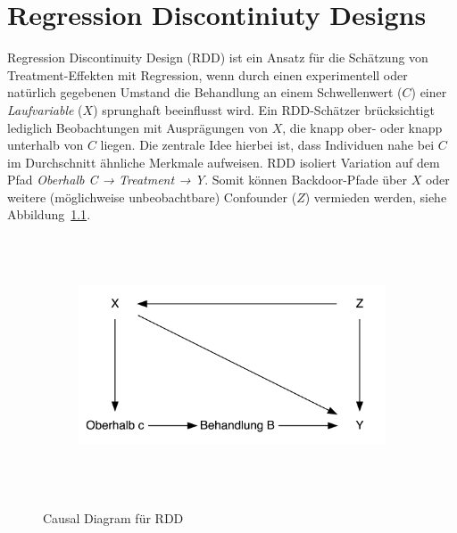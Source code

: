 \documentclass[
  letterpaper,
  DIV=11,
  oneside]{scrreprt}
\begin{document}

\hypertarget{regression-discontiniuty-designs}{%
\chapter{Regression Discontiniuty
Designs}\label{regression-discontiniuty-designs}}

Regression Discontinuity Design (RDD) ist ein Ansatz für die Schätzung
von Treatment-Effekten mit Regression, wenn durch einen experimentell
oder natürlich gegebenen Umstand die Behandlung an einem Schwellenwert
(\(C\)) einer \emph{Laufvariable} (\(X\)) sprunghaft beeinflusst wird.
Ein RDD-Schätzer brücksichtigt lediglich Beobachtungen mit Ausprägungen
von \(X\), die knapp ober- oder knapp unterhalb von \(C\) liegen. Die
zentrale Idee hierbei ist, dass Individuen nahe bei \(C\) im
Durchschnitt ähnliche Merkmale aufweisen. RDD isoliert Variation auf dem
Pfad \emph{Oberhalb C → Treatment → Y}. Somit können Backdoor-Pfade über
\(X\) oder weitere (möglichweise unbeobachtbare) Confounder (\(Z\))
vermieden werden, siehe Abbildung~\ref{fig-CDRDD}.

\begin{figure}

{\centering 

\begin{figure}[H]

{\centering \includegraphics[width=5in,height=3in]{RDD_files/figure-latex/dot-figure-1.png}

}

\end{figure}

}

\caption{\label{fig-CDRDD}Causal Diagram für RDD}

\end{figure}
\end{document}
